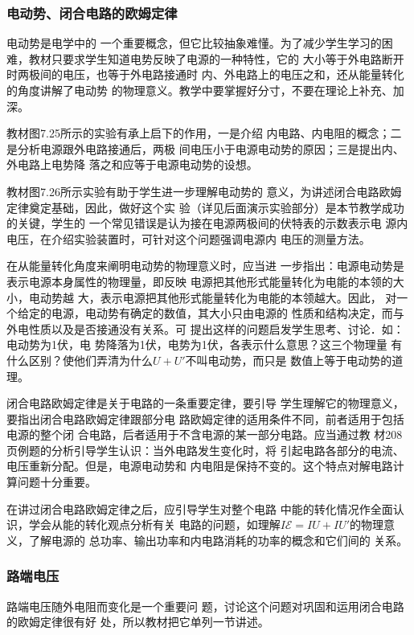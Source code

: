 \subsubsection{电动势、闭合电路的欧姆定律} 

电动势是电学中的
一个重要概念，但它比较抽象难懂。为了减少学生学习的困
难，教材只要求学生知道电势反映了电源的一种特性，它的
大小等于外电路断开时两极间的电压，也等于外电路接通时
内、外电路上的电压之和，还从能量转化的角度讲解了电动势
的物理意义。教学中要掌握好分寸，不要在理论上补充、加深。

教材图7.25所示的实验有承上启下的作用，一是介绍
内电路、内电阻的概念；二是分析电源跟外电路接通后，两极
间电压小于电源电动势的原因；三是提出内、外电路上电势降
落之和应等于电源电动势的设想。

教材图7.26所示实验有助于学生进一步理解电动势的
意义，为讲述闭合电路欧姆定律奠定基础，因此，做好这个实
验（详见后面演示实验部分）是本节教学成功的关键，学生的
一个常见错误是认为接在电源两极间的伏特表的示数表示电
源内电压，在介绍实验装置时，可针对这个问题强调电源内
电压的测量方法。

在从能量转化角度来阐明电动势的物理意义时，应当进
一步指出：电源电动势是表示电源本身属性的物理量，即反映
电源把其他形式能量转化为电能的本领的大小，电动势越
大，表示电源把其他形式能量转化为电能的本领越大。因此，
对一个给定的电源，电动势有确定的数值，其大小只由电源的
性质和结构决定，而与外电性质以及是否接通没有关系。可
提出这样的问题启发学生思考、讨论．如：电动势为1伏，电
势降落为1伏，电势为1伏，各表示什么意思？这三个物理量
有什么区别？使他们弄清为什么$U+U'$不叫电动势，而只是
数值上等于电动势的道理。

闭合电路欧姆定律是关于电路的一条重要定律，要引导
学生理解它的物理意义，要指出闭合电路欧姆定律跟部分电
路欧姆定律的适用条件不同，前者适用于包括电源的整个闭
合电路，后者适用于不含电源的某一部分电路。应当通过教
材208页例题的分析引导学生认识：当外电路发生变化时，将
引起电路各部分的电流、电压重新分配。但是，电源电动势和
内电阻是保持不变的。这个特点对解电路计算问题十分重要。

在讲过闭合电路欧姆定律之后，应引导学生对整个电路
中能的转化情况作全面认识，学会从能的转化观点分析有关
电路的问题，如理解$I\mathcal{E}=IU+IU'$的物理意义，了解电源的
总功率、输出功率和内电路消耗的功率的概念和它们间的
关系。

\subsubsection{路端电压}

路端电压随外电阻而变化是一个重要问
题，讨论这个问题对巩固和运用闭合电路的欧姆定律很有好
处，所以教材把它单列一节讲述。


